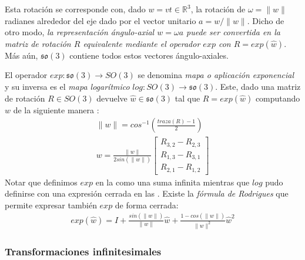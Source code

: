 \documentclass[ twoside,openright,titlepage,numbers=noenddot,%
                headinclude,footinclude,cleardoublepage=empty,abstract=on,
                BCOR=-5mm,paper=a4,fontsize=11pt
                ]{scrreprt}
\newcommand{\R}{\mathbb{R}}
\newcommand{\so}[1]{\mathfrak{so(#1)}}
\newcommand{\norm}[1]{\| #1 \|}
\begin{document}
Esta rotación se corresponde con, dado \(w = v t \in \R^3\), la rotación
de \(\omega = \norm{w}\) radianes alrededor del eje dado por el vector
unitario \(a = w / \norm{w}\). Dicho de otro modo, \emph{la
representación ángulo-axial \(w = \omega a\) puede ser convertida en la
matriz de rotación \(R\) equivalente mediante el operador \(exp\) con
\(R = exp(\hat{w})\)}. Más aún, \(\so3\) contiene todos estos vectores
ángulo-axiales.

El operador \(exp : \so3 \rightarrow SO(3)\) se denomina \emph{mapa o
aplicación exponencial} y su inversa es el \emph{mapa logarítmico}
\(log : SO(3) \rightarrow \so3\). Este, dado una matriz de rotación
\(R \in SO(3)\) devuelve \(\hat{w} \in \so3\) tal que
\(R = exp(\hat{w})\) computando \(w\) de la siguiente manera
\autocite{eadeDerivativeExponentialMap}: \begin{align}
  \norm{w} = cos^{-1} \left( \frac{traza(R) - 1}{2} \right) \label{eq:log-def-start}\\
  w = \frac{\norm{w}}{2sin(\norm{w})} \begin{bmatrix} R_{3,2} - R_{2,3} \\
  R_{1,3} - R_{3,1} \\ R_{2,1} - R_{1,2} \end{bmatrix} \label{eq:log-def-end}
\end{align} Notar que definimos \(exp\) en la  como una
suma infinita mientras que \(log\) pudo definirse con una expresión
cerrada en las . Existe la
\emph{fórmula de Rodrigues} que permite expresar también \(exp\) de
forma cerrada: \begin{align}
exp(\hat{w}) = I + \frac{sin(\norm{w})}{\norm{w}} \hat{w} + \frac{1 - cos(\norm{w})}{\norm{w}^2} \hat{w}^2
\end{align}

\hypertarget{transformaciones-infinitesimales}{%
\subsubsection{Transformaciones
infinitesimales}\label{transformaciones-infinitesimales}}
\end{document}
